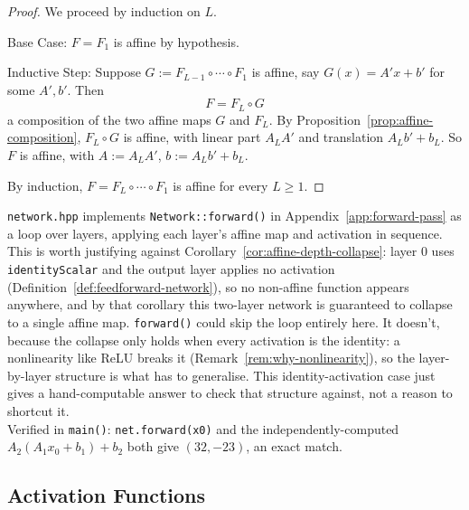 		\begin{proof}
			We proceed by induction on $L$.
			
			Base Case:
			$F=F_1$ is affine by hypothesis.
			
			Inductive Step:
			Suppose $G:=F_{L-1}\circ\cdots\circ F_1$ is affine, say $G(x)=A'x+b'$ for some $A',b'$. Then
			\[
				F = F_L\circ G
			\]
			a composition of the two affine maps $G$ and $F_L$. By Proposition~\ref{prop:affine-composition}, $F_L\circ G$ is affine, with linear part $A_LA'$ and translation $A_Lb'+b_L$. So $F$ is affine, with $A:=A_LA'$, $b:=A_Lb'+b_L$.
			
			By induction, $F=F_L\circ\cdots\circ F_1$ is affine for every $L\ge1$.
		\end{proof}
		
		\begin{compremark}
			\texttt{network.hpp} implements \texttt{Network::forward()} in Appendix~\ref{app:forward-pass} as a loop over layers, applying each layer's affine map and activation in sequence. \\
			
			This is worth justifying against Corollary~\ref{cor:affine-depth-collapse}: layer 0 uses \texttt{identityScalar} and the output layer applies no activation (Definition~\ref{def:feedforward-network}), so no non-affine function appears anywhere, and by that corollary this two-layer network is guaranteed to collapse to a single affine map. \texttt{forward()} could skip the loop entirely here. It doesn't, because the collapse only holds when every activation is the identity: a nonlinearity like ReLU breaks it (Remark~\ref{rem:why-nonlinearity}), so the layer-by-layer structure is what has to generalise. This identity-activation case just gives a hand-computable answer to check that structure against, not a reason to shortcut it. \\
			
			Verified in \texttt{main()}: \texttt{net.forward(x0)} and the independently-computed $A_2(A_1x_0+b_1)+b_2$ both give $(32,-23)$, an exact match.
		\end{compremark}
		
	\subsection{Activation Functions}
		
